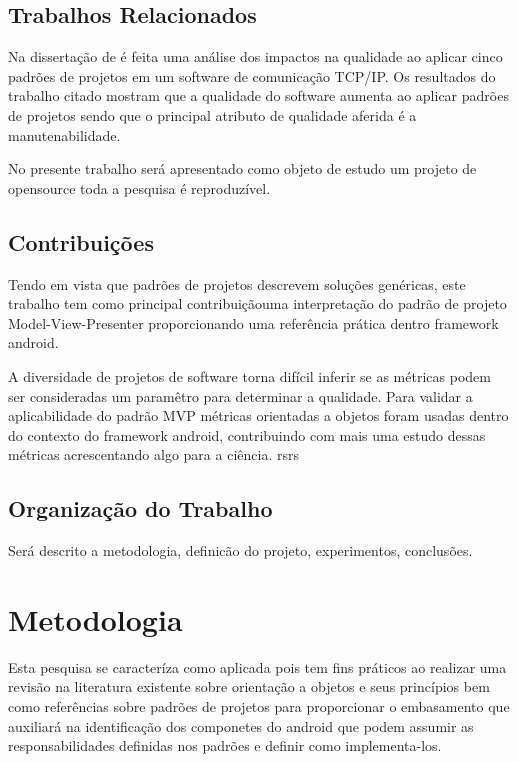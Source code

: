 \section{Trabalhos Relacionados}

Na dissertação de  é feita uma análise dos impactos na
qualidade ao aplicar cinco padrões de projetos em um software de comunicação
TCP/IP. Os resultados do trabalho citado mostram que a qualidade do software
aumenta ao aplicar padrões de projetos sendo que o principal atributo de
qualidade aferida é a manutenabilidade.

No presente trabalho será apresentado como objeto de estudo um projeto de
opensource toda a pesquisa é reproduzível.

\section{Contribuições}


Tendo em vista que padrões de projetos descrevem soluções genéricas, este
trabalho tem como principal contribuiçãouma interpretação do padrão de projeto
Model-View-Presenter proporcionando uma referência prática dentro framework
android.

A diversidade de projetos de software torna difícil inferir se as métricas
podem ser consideradas um paramêtro para determinar a qualidade. Para validar a
aplicabilidade do padrão MVP métricas orientadas a objetos foram usadas
dentro do contexto do framework android, contribuindo com mais uma estudo dessas
métricas acrescentando algo para a ciência. rsrs

\section{Organização do Trabalho}

Será descrito a metodologia, definicão do projeto, experimentos, conclusões.


\chapter{Metodologia}

Esta pesquisa se caracteríza como aplicada pois tem fins práticos ao realizar
uma revisão na literatura existente sobre orientação a objetos e seus princípios
bem como referências sobre padrões de projetos para proporcionar o embasamento
que auxiliará na identificação dos componetes do android que podem assumir as
responsabilidades definidas nos padrões e definir como implementa-los.

